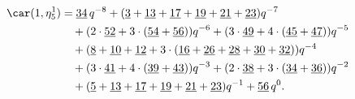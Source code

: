 \begin{align*}
	\car(1,\eta^{1}_{5})
	&=\underline{34}\,q^{-8}+(\underline{3}+\underline{13}+\underline{17}+\underline{19}+\underline{21}+\underline{23})q^{-7}\\
	&\quad+(2\cdot\underline{52}+3\cdot(\underline{54}+\underline{56}))q^{-6}+(3\cdot\underline{49}+4\cdot(\underline{45}+\underline{47}))q^{-5}\\
	&\quad+(\underline{8}+\underline{10}+\underline{12}+3\cdot(\underline{16}+\underline{26}+\underline{28}+\underline{30}+\underline{32}))q^{-4}\\
	&\quad+(3\cdot\underline{41}+4\cdot(\underline{39}+\underline{43}))q^{-3}+(2\cdot\underline{38}+3\cdot(\underline{34}+\underline{36}))q^{-2}\\
	&\quad+(\underline{5}+\underline{13}+\underline{17}+\underline{19}+\underline{21}+\underline{23})q^{-1}+\underline{56}\,q^0.
\end{align*}


